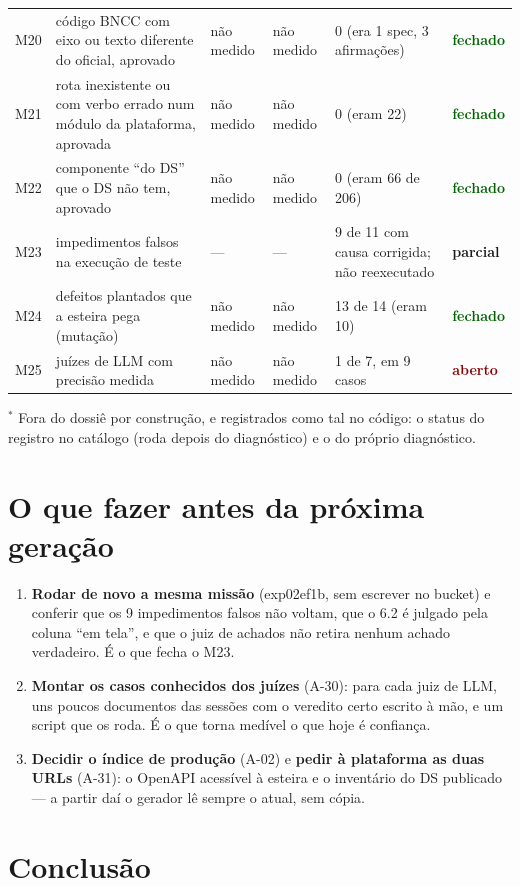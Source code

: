 \documentclass[11pt,a4paper]{article}
\newcommand{\ok}{\textcolor{DarkGreen}{\textbf{fechado}}}
\newcommand{\parcial}{\textcolor{DarkYellow}{\textbf{parcial}}}
\newcommand{\aberto}{\textcolor{DarkRed}{\textbf{aberto}}}
\begin{document}
\begin{longtable}{@{}p{0.8cm} p{5.5cm} p{1.9cm} p{2.1cm} p{2.7cm} p{1.4cm}@{}}
M20 & código BNCC com eixo ou texto diferente do oficial, aprovado & não medido & não medido & 0 (era 1 spec, 3 afirmações) & \ok \\
M21 & rota inexistente ou com verbo errado num módulo da plataforma, aprovada & não medido & não medido & 0 (eram 22) & \ok \\
M22 & componente ``do DS'' que o DS não tem, aprovado & não medido & não medido & 0 (eram 66 de 206) & \ok \\
M23 & impedimentos falsos na execução de teste & --- & --- & 9 de 11 com causa corrigida; não reexecutado & \parcial \\
M24 & defeitos plantados que a esteira pega (mutação) & não medido & não medido & 13 de 14 (eram 10) & \ok \\
M25 & juízes de LLM com precisão medida & não medido & não medido & 1 de 7, em 9 casos & \aberto \\
\end{longtable}
\normalsize
{\footnotesize $^*$ Fora do dossiê por construção, e registrados como tal no código: o status do registro no catálogo (roda depois do diagnóstico) e o do próprio diagnóstico.}

\section{O que fazer antes da próxima geração}

\begin{enumerate}[leftmargin=*]
  \item \textbf{Rodar de novo a mesma missão} (exp02ef1b, sem escrever no bucket) e conferir que os 9 impedimentos falsos não voltam, que o 6.2 é julgado pela coluna ``em tela'', e que o juiz de achados não retira nenhum achado verdadeiro. É o que fecha o M23.
  \item \textbf{Montar os casos conhecidos dos juízes} (A-30): para cada juiz de LLM, uns poucos documentos das sessões com o veredito certo escrito à mão, e um script que os roda. É o que torna medível o que hoje é confiança.
  \item \textbf{Decidir o índice de produção} (A-02) e \textbf{pedir à plataforma as duas URLs} (A-31): o OpenAPI acessível à esteira e o inventário do DS publicado --- a partir daí o gerador lê sempre o atual, sem cópia.
\end{enumerate}

\section{Conclusão}
\end{document}
